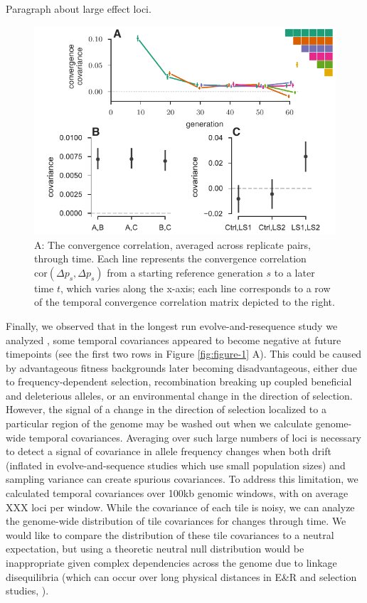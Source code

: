\documentclass[11pt]{article}
\begin{document}
Paragraph about large effect loci.

\begin{figure}[!ht]
  \centering
  \includegraphics[width=\textwidth]{figures/figure-2.pdf}

  \caption{A: The convergence correlation, averaged across replicate pairs,
    through time. Each line represents the convergence correlation
    $\mathrm{cor}(\Delta p_{s}, \Delta p_{s})$ from a starting reference
    generation $s$ to a later time $t$, which varies along the x-axis; each
  line corresponds to a row of the temporal convergence correlation matrix
depicted to the right.}

  \label{fig:figure-2}
\end{figure}

Finally, we observed that in the longest run evolve-and-resequence study we
analyzed \parencite{Barghi2019-qy}, some temporal covariances appeared to
become negative at future timepoints (see the first two rows in Figure
\ref{fig:figure-1} A). This could be caused by advantageous fitness backgrounds
later becoming disadvantageous, either due to frequency-dependent selection,
recombination breaking up coupled beneficial and deleterious alleles, or an
environmental change in the direction of selection. However, the signal of a
change in the direction of selection localized to a particular region of the
genome may be washed out when we calculate genome-wide temporal covariances.
Averaging over such large numbers of loci is necessary to detect a signal of
covariance in allele frequency changes when both drift (inflated in
evolve-and-sequence studies which use small population sizes) and sampling
variance can create spurious covariances. To address this limitation, we
calculated temporal covariances over 100kb genomic windows, with on average XXX
loci per window. While the covariance of each tile is noisy, we can analyze the
genome-wide distribution of tile covariances for changes through time. We would
like to compare the distribution of these tile covariances to a neutral
expectation, but using a theoretic neutral null distribution would be
inappropriate given complex dependencies across the genome due to linkage
disequilibria (which can occur over long physical distances in E\&R and
selection studies, \cite{Nuzhdin2013-gf,Baldwin-Brown2014-cl}). 
\end{document}

